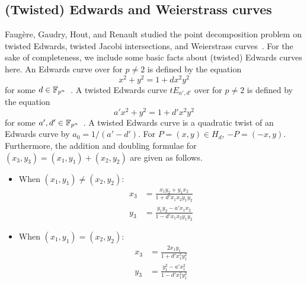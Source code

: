 \subsection{(Twisted) Edwards and Weierstrass curves}

Faug\`ere, Gaudry, Hout, and Renault studied the point decomposition
problem on twisted Edwards, twisted Jacobi intersections, and
Weierstrass curves~\cite{DBLP:conf/eurocrypt/FaugereHJRV14}.
%
For the sake of completeness, we include some basic facts about
(twisted) Edwards curves here.
%
%
An Edwards curve over  for $p\neq 2$ is defined by the
equation \begin{equation*}
  x^2+y^2=1+dx^2y^2 \label{eq:edwards-curve} \end{equation*} for some
$d\in\mathbb F_{p^n}$~\cite{DBLP:journals/iacr/BernsteinL07}.
%
A twisted Edwards curve $tE_{a',d'}$ over  for $p\neq 2$ is
defined by the equation \begin{equation}
  a'x^2+y^2=1+d'x^2y^2 \label{eq:twisted-edwards-curve} \end{equation}
for some $a',d'\in\mathbb F_{p^n}$~\cite{DBLP:journals/iacr/BernsteinBJLP08}.
%
A twisted Edwards curve is a quadratic twist of an Edwards curve by
$a_0=1/(a'-d')$.
%
For $P=(x,y)\in H_d$, $-P=(-x,y)$.
%
Furthermore, the addition and doubling formulae for
$(x_3,y_3)=(x_1,y_1)+(x_2,y_2)$ are given as follows.
%
\begin{itemize}
\item When $(x_1,y_1)\neq(x_2,y_2)$:
  \begin{align*}
    x_3 & = \frac{x_1y_2 + y_1x_2}{1 + d'x_1x_2y_1y_2} \\
    y_3 & = \frac{y_1y_2 - a'x_1x_2}{1 - d'x_1x_2y_1y_2}
  \end{align*}
\item When $(x_1,y_1)=(x_2,y_2)$:
  \begin{align*}
    x_3 & = \frac{2x_1y_1}{1 + d'x_1^2y_1^2} \\
    y_3 & = \frac{y_1^2 - a'x_1^2}{1 - d'x_1^2y_1^2}
  \end{align*}
\end{itemize}
 